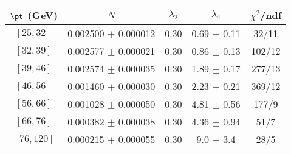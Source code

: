 \begin{tabular}{c||c|c|c|c}
$\pt$ (GeV) & $N$ & $\lambda_{2}$ & $\lambda_4$  & $\chi^2$/ndf  \\
\hline
$[25, 32]$ & 0.002500 $\pm$ 0.000012 & 0.30 & 0.69 $\pm$ 0.11 & 32/11\\
$[32, 39]$ & 0.002577 $\pm$ 0.000021 & 0.30 & 0.86 $\pm$ 0.13 & 102/12\\
$[39, 46]$ & 0.002574 $\pm$ 0.000035 & 0.30 & 1.89 $\pm$ 0.17 & 277/13\\
$[46, 56]$ & 0.001460 $\pm$ 0.000030 & 0.30 & 2.23 $\pm$ 0.21 & 369/12\\
$[56, 66]$ & 0.001028 $\pm$ 0.000050 & 0.30 & 4.81 $\pm$ 0.56 & 177/9\\
$[66, 76]$ & 0.000382 $\pm$ 0.000038 & 0.30 & 4.36 $\pm$ 0.94 & 51/7\\
$[76, 120]$ & 0.000215 $\pm$ 0.000055 & 0.30 & 9.0 $\pm$ 3.4 & 28/5\\
\end{tabular}
